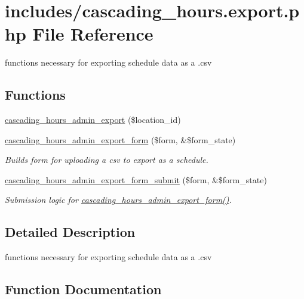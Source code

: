 \hypertarget{cascading__hours_8export_8php}{}\section{includes/cascading\+\_\+hours.export.\+php File Reference}
\label{cascading__hours_8export_8php}


functions necessary for exporting schedule data as a .csv  


\subsection*{Functions}
\begin{DoxyCompactItemize}
\item 
\hyperlink{cascading__hours_8export_8php_a654802363a2b6581dfdb63760c6074c9_a654802363a2b6581dfdb63760c6074c9}{cascading\+\_\+hours\+\_\+admin\+\_\+export} (\$location\+\_\+id)
\item 
\hyperlink{cascading__hours_8export_8php_a45e36bef3ca250d384693acc523d2f11_a45e36bef3ca250d384693acc523d2f11}{cascading\+\_\+hours\+\_\+admin\+\_\+export\+\_\+form} (\$form, \&\$form\+\_\+state)
\begin{DoxyCompactList}\small\item\em Builds form for uploading a csv to export as a schedule. \end{DoxyCompactList}\item 
\hyperlink{cascading__hours_8export_8php_aba3f1d31de2c60482434147bde66acd9_aba3f1d31de2c60482434147bde66acd9}{cascading\+\_\+hours\+\_\+admin\+\_\+export\+\_\+form\+\_\+submit} (\$form, \&\$form\+\_\+state)
\begin{DoxyCompactList}\small\item\em Submission logic for \hyperlink{cascading__hours_8export_8php_a45e36bef3ca250d384693acc523d2f11_a45e36bef3ca250d384693acc523d2f11}{cascading\+\_\+hours\+\_\+admin\+\_\+export\+\_\+form()}. \end{DoxyCompactList}\end{DoxyCompactItemize}


\subsection{Detailed Description}
functions necessary for exporting schedule data as a .csv 



\subsection{Function Documentation}
\mbox{\label{cascading__hours_8export_8php_a654802363a2b6581dfdb63760c6074c9_a654802363a2b6581dfdb63760c6074c9}} 
